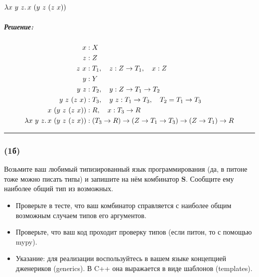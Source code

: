 \documentclass{article}
\newenvironment{proof}{\subparagraph{\hspace{-1em}Решение:\newline}}{\par\noindent\rule{\textwidth}{0.4pt}}
\newcommand{\term}[1]{\mathbf{#1}}
\begin{document}
    \paragraph{} $\lambda x~y~z\ldotp x~(y~z~(z~x))$

    \begin{proof}
        \[
            \begin{aligned}
                x & : X \\
                z & : Z \\
                z\ x & : T_1, \quad z : Z \to T_1, \quad x : Z \\
                y & : Y \\
                y\ z & : T_2, \quad y : Z \to T_1 \to T_2 \\
                y\ z\ (z\ x) & : T_3, \quad y\ z : T_1 \to T_3, \quad T_2 = T_1 \to T_3 \\
                x\ (y\ z\ (z\ x)) & : R, \quad x : T_3 \to R \\
                \lambda x~y~z \ldotp x~(y~z~(z~x)) & : (T_3 \to R) \to (Z \to T_1 \to T_3) \to (Z \to T_1) \to R
            \end{aligned}
        \]
    \end{proof}

    \subsubsection{(1б)}

    Возьмите ваш любимый типизированный язык программирования (да, в питоне тоже можно писать типы) и запишите на нём комбинатор $\term{S}$.
    Сообщите ему наиболее общий тип из возможных.
    \begin{itemize}
        \item Проверьте в тесте, что ваш комбинатор справляется с наиболее общим возможным случаем типов его аргументов.
        \item Проверьте, что ваш код проходит проверку типов (если питон, то с помощью mypy).
        \item Указание: для реализации воспользуйтесь в вашем языке концепцией дженериков (generics).
        В C++ она выражается в виде шаблонов (templates).
    \end{itemize}
\end{document}
